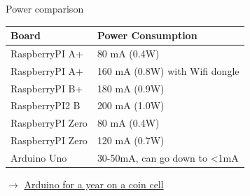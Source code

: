 \documentclass[compress]{beamer}
\begin{document}
\begin{frame}{Power comparison}
\begin{tabular}{@{}ll@{}}
\toprule
\textbf{Board}   & \textbf{Power Consumption}           \\ \midrule
RaspberryPI A+   & 80 mA (0.4W)                         \\
RaspberryPI A+   & 160 mA (0.8W) with Wifi dongle       \\
RaspberryPI B+   & 180 mA (0.9W)                        \\
RaspberryPI2 B   & 200 mA (1.0W)                        \\
RaspberryPI Zero & 80 mA (0.4W)                         \\
RaspberryPI Zero & 120 mA (0.7W)                        \\
Arduino Uno      & 30-50mA, can go down to \textless1mA \\ \bottomrule
\end{tabular}

\vspace{1em}
$\rightarrow$ \href{http://www.home-automation-community.com/arduino-low-power-how-to-run-atmega328p-for-a-year-on-coin-cell-battery/}{Arduino for a year on a coin cell}

\end{frame}
\end{document}
